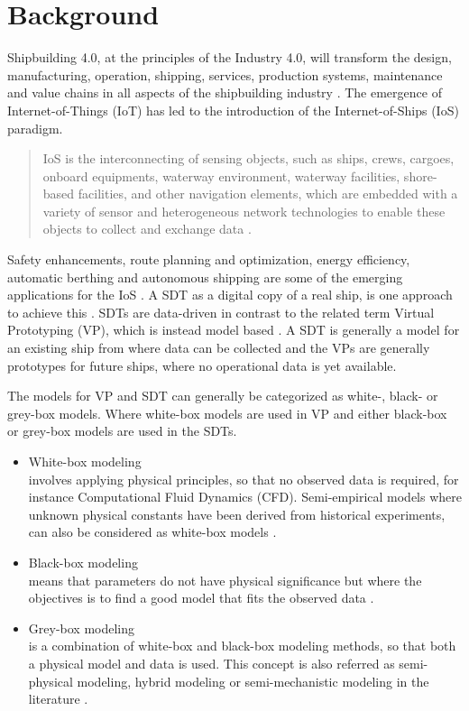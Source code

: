 \section{Background}
Shipbuilding 4.0, at the principles of the Industry 4.0, will transform the design, manufacturing, operation, shipping, services, production systems, maintenance and value chains in all aspects of the shipbuilding 
industry \cite{stanic_toward_2018}.
The emergence of Internet-of-Things (IoT) has led to the introduction of the Internet-of-Ships (IoS) paradigm. \begin{quote} IoS is the interconnecting of sensing objects, such as ships, crews, cargoes, onboard equipments, waterway environment, waterway facilities, shore-based facilities, and other navigation elements, which are embedded with a variety of sensor and heterogeneous network technologies to enable these objects to collect and exchange data \cite{liu_internet_2016-1}.\end{quote}
Safety enhancements, route planning and optimization, energy efficiency, automatic berthing and autonomous shipping are some of the emerging applications for the IoS \cite{aslam_internet_2020}.
A SDT as a digital copy of a real ship, is one approach to achieve this \cite{chen_review_2021}. 
SDTs are data-driven in contrast to the related term Virtual Prototyping (VP), which is instead model based \cite{major_framework_2021}. A SDT is generally a model for an existing ship from where data can be collected and the VPs are generally prototypes for future ships, where no operational data is yet available.

The models for VP and SDT can generally be categorized as white-, black- or grey-box models. Where 
white-box models are used in VP and either black-box or grey-box models are used in the SDTs. 
\begin{itemize}
    \item White-box modeling \\
    involves applying physical principles, so that no observed data is required, for instance Computational Fluid Dynamics (CFD). Semi-empirical models where unknown physical constants have been derived from historical experiments, can also be considered as white-box models \cite{leifsson_grey-box_2008}.  

    \item Black-box modeling \\
    means that parameters do not have physical significance but where the objectives is to find a good model that fits the observed data \cite{lindskog_tools_1995}.
    
    \item Grey-box modeling \\
    is a combination of white-box and black-box modeling methods, so that both a physical model and data is used. This concept is also referred as semi-physical modeling, hybrid modeling or semi-mechanistic modeling in the literature \cite{leifsson_grey-box_2008}. 
\end{itemize}


